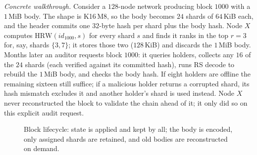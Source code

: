 \emph{Concrete walkthrough.} Consider a $128$-node network producing block $1000$ with a $1$\,MiB
body. The shape is K16\,M8, so the body becomes $24$ shards of $64$\,KiB each, and the header
commits one $32$-byte hash per shard plus the body hash. Node $X$ computes
$\mathrm{HRW}(\textit{id}_{1000},s)$ for every shard $s$ and finds it ranks in the top
$r{=}3$ for, say, shards $\{3,7\}$; it stores those two ($128$\,KiB) and discards the
$1$\,MiB body. Months later an auditor requests block $1000$: it queries holders, collects any
$16$ of the $24$ shards (each verified against its committed hash), runs RS decode to rebuild the
$1$\,MiB body, and checks the body hash. If eight holders are offline the remaining sixteen still
suffice; if a malicious holder returns a corrupted shard, its hash mismatch excludes it and another
holder's shard is used instead. Node $X$ never reconstructed the block to validate the chain ahead
of it; it only did so on this explicit audit request.

\begin{figure}[t]
\centering
{}
\caption{Block lifecycle: state is applied and kept by all; the body is encoded, only assigned
shards are retained, and old bodies are reconstructed on demand.}
\label{fig:lifecycle}
\end{figure}

